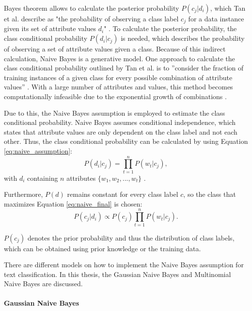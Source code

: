        Bayes theorem allows to calculate the posterior probability $P(c_j|d_i)$, which Tan et al. describe as "the probability of observing a class label $c_j$ for a data instance given its set of attribute values $d_i$" \cite[p.~418]{DBLP:books/aw/TanSKK2019}. To calculate the posterior probability, the class conditional probability $P(d_i|c_j)$ is needed, which describes the probability of observing a set of attribute values given a class. Because of this indirect calculation, Naive Bayes is a generative model. One approach to calculate the class conditional probability outlined by Tan et al. is to ''consider the fraction of training instances of a given class for every possible combination of attribute values'' \cite[p.~419]{DBLP:books/aw/TanSKK2019}. With a large number of attributes and values, this method becomes computationally infeasible due to the exponential growth of combinations \cite{DBLP:books/aw/TanSKK2019}.

        Due to this, the Naive Bayes assumption is employed to estimate the class conditional probability. Naive Bayes assumes conditional independence, which states that attribute values are only dependent on the class label and not each other. Thus, the class conditional probability can be calculated by using Equation \eqref{eq:naive_assumption}:
        \begin{equation}
            \label{eq:naive_assumption}
            P(d_i|c_j) = \prod_{t=1}^{n}P(w_{t}|c_j),
        \end{equation}
        with $d_i$ containing $n$ attributes $\{w_1,w_2,...,w_t\}$ \cite{DBLP:books/aw/TanSKK2019}.

        Furthermore, $P(d)$ remains constant for every class label $c$, so the class that maximizes Equation \eqref{eq:naive_final} is chosen: 
        \begin{equation}
            \label{eq:naive_final}
            P(c_j|d_i)\propto P(c_j)\prod_{t=1}^{n}P(w_{t}|c_j) .
        \end{equation}   
        
        $P(c_j)$ denotes the prior probability and thus the distribution of class labels, which can be obtained using prior knowledge or the training data.
        

        There are different models on how to implement the Naive Bayes assumption for text classification. In this thesis, the Gaussian Naive Bayes and Multinomial Naive Bayes are discussed. 
        
        \paragraph{Gaussian Naive Bayes} \mbox{} \\

